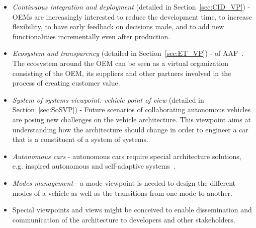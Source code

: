 	\begin{itemize}
	\item \emph{Continuous integration and deployment} (detailed in Section~\ref{sec:CID_VP}) - OEMs are increasingly interested to reduce the development time, to increase flexibility, to have early feedback on decisions made, and to add new functionalities incrementally even after production. %
		\item \emph{Ecosystem and transparency} (detailed in Section~\ref{sec:ET_VP}) -  of AAF~\cite{TUM-I0915,Broy}. %
		The ecosystem around the OEM can be seen as a virtual %
	organization consisting of the OEM, its suppliers and other partners %
	involved in the process of creating customer value.
	\item \emph{System of systems viewpoint: vehicle point of view} (detailed in Section~\ref{sec:SoSVP}) - Future scenarios of collaborating autonomous vehicles are posing new challenges on the vehicle architecture. This viewpoint aims at understanding how the architecture should change in order to engineer a car that is a constituent of a system of systems.
	\item \emph{Autonomous cars} - autonomous cars require special architecture solutions, e.g. inspired  autonomous and self-adaptive systems~\cite{Salehie2009}.
	\item \emph{Modes management} - a mode viewpoint is needed to design the different modes of a vehicle as well as the transitions from one mode to another.
	\item Special viewpoints and views might be conceived to enable dissemination and communication of the architecture to developers and other stakeholders.
	\end{itemize}

